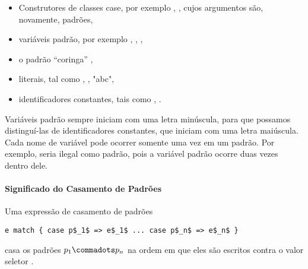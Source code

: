 \begin{itemize}
\item Construtores de classes case, por exemplo , , cujos
argumentos s\~{a}o, novamente, padr\~{o}es, 
\item vari\'{a}veis padr\~{a}o, por exemplo , , , 
\item o padr\~{a}o ``coringa'' \code{_},
\item literais, tal como , ,  "abc", 
\item identificadores constantes, tais como , .  
\end{itemize}

Vari\'{a}veis padr\~{a}o sempre iniciam com uma letra min\'{u}scula, para que possamos
distingu\'{i}-las de identificadores constantes, que iniciam com uma letra 
mai\'{u}scula. Cada nome de vari\'{a}vel pode ocorrer somente uma vez em um padr\~{a}o. 
Por exemplo,  seria ilegal como padr\~{a}o, pois a vari\'{a}vel padr\~{a}o 
 ocorre duas vezes dentro dele.  


\paragraph{Significado do Casamento de Padr\~{o}es}
Uma express\~{a}o de casamento de padr\~{o}es

\begin{lstlisting}
e match { case p$_1$ => e$_1$ ... case p$_n$ => e$_n$ }
\end{lstlisting}
casa os padr\~{o}es $p_1 \commadots p_n$ na ordem em que eles s\~{a}o 
escritos contra o valor seletor .


